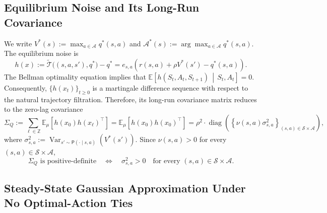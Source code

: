 \documentclass[11pt,letterpaper]{article}
\theoremstyle{plain}
\theoremstyle{definition}
\theoremstyle{remark}
\newcommand{\E}{\mathbb{E}}
\newcommand{\mS}{\mathcal{S}}
\newcommand{\mA}{\mathcal{A}}
\begin{document}
\subsection{Equilibrium Noise and Its Long-Run Covariance}
\label{sec:q-equilibrium-noise}
We write $ V^*(s)
    :=
    \max_{a\in\mA}q^*(s,a)$ and $\mA^*(s)
    :=
    \arg\max_{a\in\mA}q^*(s,a)$. The equilibrium noise  is
\begin{equation*}
    h(x):=
    \widetilde{\mathcal T}
    \bigl((s,a,s'),q^*\bigr)
    -
    q^* =
    e_{s,a}(r(s,a)
    +
    \rho V^*(s')
    -
    q^*(s,a)).
\end{equation*}
The Bellman optimality equation implies that $\E\left[
        h(S_t,A_t,S_{t+1})
        \,\middle|\,
        S_t,A_t
    \right]
    =
    0.$ Consequently, \(\{h(x_t)\}_{t\geq0}\) is a martingale difference
sequence with respect to the natural trajectory filtration. Therefore, its long-run covariance matrix reduces to the zero-lag covariance
\begin{equation*}
    \Sigma_Q
:=
    \sum_{\ell\in\mathbb Z}
    \E_\mu\left[
        h(x_0)h(x_\ell)^\top
    \right] =
    \E_\mu\left[
        h(x_0)h(x_0)^\top
    \right]=
    \rho^2\cdot\operatorname{diag}
    \left(
        \left\{
            \nu(s,a)\sigma_{s,a}^2
        \right\}_{(s,a)\in\mS\times\mA}
    \right),
\end{equation*}
where $\sigma_{s,a}^2
    :=
    \operatorname{Var}_{s'\sim\mathsf P(\cdot\mid s,a)}
    \left( V^*(s')
    \right).$ Since \(\nu(s,a)>0\) for every $(s,a) \in \mathcal S \times \mathcal A$,
\begin{equation}
\label{eq:q-covariance-pd-condition}
    \Sigma_Q \text{ is positive-definite}
    \quad\Longleftrightarrow\quad
    \sigma_{s,a}^2>0
    \quad
    \text{for every }(s,a)\in\mS\times\mA.
\end{equation}

\subsection{Steady-State Gaussian Approximation Under No Optimal-Action Ties}
\label{sec:q-no-ties}
\end{document}

